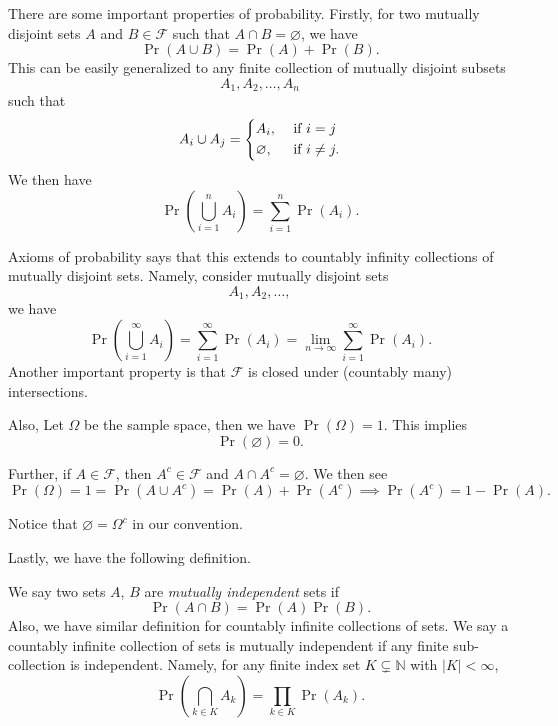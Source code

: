 There are some important properties of probability. Firstly, for two mutually disjoint sets \(A\) and \(B\in\mathcal{F}\) such that \(A\cap B = \varnothing\), we have
\[
	\Pr(A\cup B) = \Pr(A) + \Pr(B).
\]
This can be easily generalized to any finite collection of mutually disjoint subsets
\[
	A_1, A_2, \dots , A_n
\]
such that
\[
	A_i \cup A_j = \begin{dcases}
		A_i,         & \text{ if }i = j    \\
		\varnothing, & \text{ if }i\neq j.
	\end{dcases}
\]
We then have
\[
	\Pr(\bigcup\limits_{i = 1}^n A_{i}) = \sum\limits_{i=1}^{n} \Pr(A_{i}).
\]
\begin{remark}
	Axioms of probability says that this extends to countably infinity collections of mutually disjoint sets. Namely, consider mutually disjoint sets
	\[
		A_1, A_2, \dots,
	\]
	we have
	\[
		\Pr(\bigcup\limits_{i=1}^{\infty} A_{i}) = \sum\limits_{i=1}^{\infty} \Pr(A_{i}) = \lim_{n \to \infty} \sum\limits_{i=1}^{\infty} \Pr(A_{i}).
	\]
	Another important property is that \(\mathcal{F}\) is closed under (countably many) intersections.
\end{remark}

Also, Let \(\Omega\) be the sample space, then we have \(\Pr(\Omega) = 1\). This implies
\[
	\Pr(\varnothing ) = 0.
\]

Further, if \(A\in\mathcal{F}\), then \(A^{c}\in\mathcal{F}\) and \(A\cap A^{c}= \varnothing \). We then see
\[
	\Pr(\Omega) = 1 = \Pr(A\cup A^{c}) = \Pr(A) + \Pr(A^{c}) \implies \Pr(A^{c}) = 1 - \Pr(A).
\]

\begin{note}
	Notice that \(\varnothing  = \Omega^{c}\) in our convention.
\end{note}

Lastly, we have the following definition.
\begin{definition}\label{def:mutually-independent}
	We say two sets \(A\), \(B\) are \emph{mutually independent} sets if
	\[
		\Pr(A\cap B) = \Pr(A)\Pr(B).
	\]
	Also, we have similar definition for countably infinite collections of sets. We say a countably infinite collection of sets is mutually independent if any finite sub-collection is independent. Namely, for any finite index set \(K\subsetneq \mathbb{N}\) with \(\left\vert K \right\vert < \infty \),
	\[
		\Pr(\bigcap\limits_{k\in K} A_k) = \prod_{k\in K} \Pr(A_k).
	\]
\end{definition}

